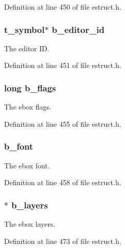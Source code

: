 Definition at line 450 of file estruct.\-h.

\hypertarget{struct__ebox_adf8c80c6ea45ad810c754984d98830ff}{
\subsubsection[{b\-\_\-editor\-\_\-id}]{\setlength{\rightskip}{0pt plus 5cm}t\-\_\-symbol$\ast$ b\-\_\-editor\-\_\-id}}\label{struct__ebox_adf8c80c6ea45ad810c754984d98830ff}
The editor I\-D. 

Definition at line 451 of file estruct.\-h.

\hypertarget{struct__ebox_abdae234dbd983dfbfb0592858c4ff026}{
\subsubsection[{b\-\_\-flags}]{\setlength{\rightskip}{0pt plus 5cm}long b\-\_\-flags}}\label{struct__ebox_abdae234dbd983dfbfb0592858c4ff026}
The ebox flags. 

Definition at line 455 of file estruct.\-h.

\hypertarget{struct__ebox_a4071412a20456f5fcafe2a91cdef11c3}{
\subsubsection[{b\-\_\-font}]{ b\-\_\-font}}\label{struct__ebox_a4071412a20456f5fcafe2a91cdef11c3}
The ebox font. 

Definition at line 458 of file estruct.\-h.

\hypertarget{struct__ebox_ad80949f483467d74761a9e321300d64e}{
\subsubsection[{b\-\_\-layers}]{$\ast$ b\-\_\-layers}}\label{struct__ebox_ad80949f483467d74761a9e321300d64e}
The ebox layers. 

Definition at line 473 of file estruct.\-h.

